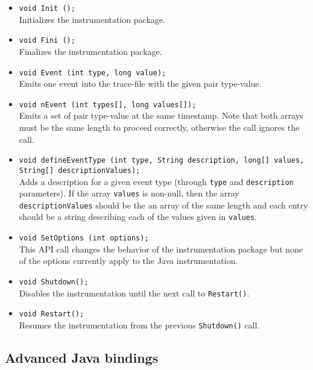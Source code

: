 \begin{itemize}

  \item \texttt{void Init ();}\\
  Initializes the instrumentation package.

  \item \texttt{void Fini ();}\\
  Finalizes the instrumentation package.

  \item \texttt{void Event (int type, long value);}\\
  Emits one event into the trace-file with the given pair type-value.

  \item \texttt{void nEvent (int types[], long values[]);}\\
  Emits a set of pair type-value at the same timestamp. Note that both arrays must be the same length to proceed correctly, otherwise the call ignores the call.

  \item \texttt{void defineEventType (int type, String description, long[] values, String[] descriptionValues);}\\
  Adds a description for a given event type (through \texttt{type} and \texttt{description} parameters). If the array \texttt{values} is non-null, then the array \texttt{descriptionValues} should be the an array of the same length and each entry should be a string describing each of the values given in \texttt{values}.

  \item \texttt{void SetOptions (int options);}\\
  This API call changes the behavior of the instrumentation package but none of the options currently apply to the Java instrumentation.

  \item \texttt{void Shutdown();}\\
  Disables the instrumentation until the next call to \texttt{Restart()}.

  \item \texttt{void Restart();}\\
  Resumes the instrumentation from the previous \texttt{Shutdown()} call.

\end{itemize}

\subsection{Advanced Java bindings}\label{subsec:AdvancedJavaBindings}

